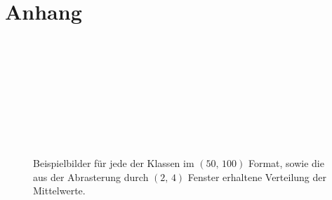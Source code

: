 \section{Anhang}

\begin{figure}
 \centering
  \begin{subfigure}[Genauigkeit]{
 \texttt{[image: fig/NORMALornotlog6test.pdf]}}
  \end{subfigure}
 \begin{subfigure}[Verlustfunktion]{
 \texttt{[image: fig/CNVornotlog6test.pdf]}}
  \end{subfigure} \\
  \begin{subfigure}[Genauigkeit]{
 \texttt{[image: fig/DMEornotlog6test.pdf]}}
  \end{subfigure}
 \begin{subfigure}[Verlustfunktion]{
 \texttt{[image: fig/DRUSENornotlog6test.pdf]}}
  \end{subfigure}
\end{figure}


\begin{figure}[!t]
\centering
\begin{subfigure}[Normal]{
\texttt{[image: fig/imageNORMALscan.pdf]}}
\end{subfigure}%
\begin{subfigure}[Normal]{
\texttt{[image: fig/imageNORMALmeans.pdf]}}
\end{subfigure}\\
\begin{subfigure}[CNV]{
\texttt{[image: fig/imageCNVscan.pdf]}}
\end{subfigure}%
\begin{subfigure}[CNV]{
\texttt{[image: fig/imageCNVmeans.pdf]}}
\end{subfigure}\\
\begin{subfigure}[DME]{
\texttt{[image: fig/imageDMEscan.pdf]}}
\end{subfigure}%
\begin{subfigure}[DME]{
\texttt{[image: fig/imageDMEmeans.pdf]}}
\end{subfigure}\\
\begin{subfigure}[DRUSEN]{
\texttt{[image: fig/imageDRUSENscan.pdf]}}
\end{subfigure}%
\begin{subfigure}[DRUSEN]{
\texttt{[image: fig/imageDRUSENmeans.pdf]}}
\end{subfigure}\\
\caption{Beispielbilder für jede der Klassen im $(50,\,100)$ Format, sowie die aus der Abrasterung durch $(2,\,4)$ Fenster erhaltene Verteilung der Mittelwerte.}
\label{fig:input}
\end{figure}%